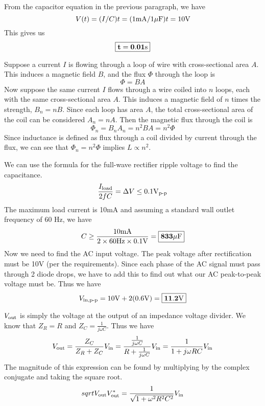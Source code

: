 \documentclass{article}
\begin{document}
    From the capacitor equation in the previous paragraph, we have 
    \[V(t) = (I/C)t = (1 \text{m}\text{A}/1\mu\text{F})t = 10\text{V}\]
    This gives us
    \[\boxed{\mathbf{t = 0.01\text{s}}}\]

    Suppose a current \(I\) is flowing through a loop of wire with cross-sectional area \(A\).
    This induces a magnetic field \(B\), and the flux \(\Phi\) through the loop is
    \[\Phi = BA\]
    Now suppose the same current \(I\) flows through a wire coiled into \(n\) loops, each with the same cross-sectional area \(A\).
    This induces a magnetic field of \(n\) times the strength, \(B_n = nB\). Since each loop has area \(A\),
    the total cross-sectional area of the coil can be considered \(A_n = nA\). Then the magnetic flux
    through the coil is
    \[\Phi_n = B_nA_n = n^2BA = n^2\Phi\]
    Since inductance is defined as flux through a coil divided by current through the flux,
    we can see that \(\Phi_n = n^2\Phi\) implies \(L \propto n^2\).

    We can use the formula for the full-wave rectifier ripple voltage to find the capacitance.
    \[\frac{I_{\text{load}}}{2fC} = \Delta V \le 0.1 \text{V}_{\text{p-p}}\]
    The maximum load current is 10mA and assuming a standard wall outlet frequency of 60 Hz, we have
    \[C \ge \frac{10\text{m}\text{A}}{2\times 60\text{Hz} \times 0.1\text{V}} = \boxed{\mathbf{833 \mu\text{F}}}\]
    Now we need to find the AC input voltage. The peak voltage after rectification must be 10V (per the requirements). Since each phase of the AC signal must pass through 2 diode drops, we have to add this to find out what our AC peak-to-peak voltage must be. Thus we have
    \[V_{\text{in}, \text{p-p}} = 10\text{V} + 2(0.6\text{V}) = \boxed{\mathbf{11.2\text{V}}}\]

    $V_{\text{out}}$ is simply the voltage at the output of an impedance voltage divider. We know that $Z_R = R$ and $Z_C = \frac{1}{j\omega C}$. Thus we have 
    \[V_{\text{out}} = \frac{Z_C}{Z_R + Z_C} V_{\text{in}} = \frac{\frac{1}{j \omega C}}{R + \frac{1}{j \omega C}} V_{\text{in}} = \frac{1}{1 + j \omega R C} V_{\text{in}}\]
    The magnitude of this expression can be found by multiplying by the complex conjugate and taking the square root.
    \[sqrt{V_{\text{out}} V_{\text{out}}^*} = \frac{1}{\sqrt{1 + \omega^2R^2C^2}}V_{\text{in}}\]
    
\end{document}
